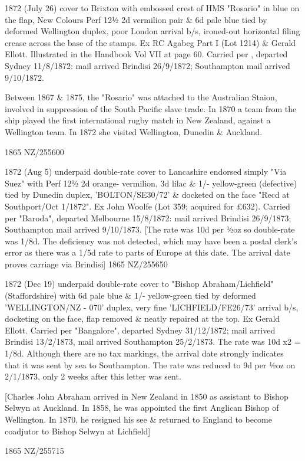 \documentclass[justified]{tufte-book}
\begin{document}
%
{1872 (July 26) cover to Brixton with embossed crest of HMS "Rosario" in blue on the flap, New Colours Perf 12½ 2d vermilion pair \& 6d pale blue tied by deformed Wellington duplex, poor London arrival b/s, ironed-out horizontal filing crease across the base of the stamps. Ex RC Agabeg Part I (Lot 1214) \& Gerald Ellott. Illustrated in the Handbook Vol VII at page 60. Carried per , departed Sydney 11/8/1872: mail arrived Brindisi 26/9/1872; Southampton mail arrived 9/10/1872.

Between 1867 \& 1875, the "Rosario" was attached to the Australian Staion, involved in suppression of the South Pacific slave trade. In 1870 a team from the ship played the first international rugby match in New Zealand, against a Wellington team. In 1872 she visited Wellington, Dunedin \& Auckland.}%
{1865}%
{NZ/255600}%
{}%
{}
{}%
{}%

%
{1872 (Aug 5) underpaid double-rate cover to Lancashire endorsed simply "Via Suez" with Perf 12½ 2d orange- vermilion, 3d lilac \& 1/- yellow-green (defective) tied by Dunedin duplex, 'BOLTON/SE30/72' \& docketed on the face "Recd at Southport/Oct 1/1872". Ex John Woolfe (Lot 359; acquired for £632). Carried per "Baroda", departed Melbourne 15/8/1872: mail arrived Brindisi 26/9/1873; Southampton mail arrived 9/10/1873. [The rate was 10d per ½oz so double-rate was 1/8d. The deficiency was not detected, which may have been a postal clerk's error as there was a 1/5d rate to parts of Europe at this date. The arrival date proves carriage via Brindisi]}%
{1865}%
{NZ/255650}%
{}%
{}
{}%
{}%

%
{1872 (Dec 19) underpaid double-rate cover to "Bishop Abraham/Lichfield" (Staffordshire) with 6d pale blue \& 1/- yellow-green tied by deformed 'WELLINGTON/NZ - 070' duplex, very fine 'LICHFIELD/FE26/73' arrival b/s, docketing on the face, flap removed \& neatly repaired at the top. Ex Gerald Ellott. Carried per "Bangalore", departed Sydney 31/12/1872; mail arrived Brindisi 13/2/1873, mail arrived Southampton 25/2/1873. The rate was 10d x2 = 1/8d. Although there are no tax markings, the arrival date strongly indicates that it was sent by sea to Southampton. The rate was reduced to 9d per ½oz on 2/1/1873, only 2 weeks after this letter was sent. 

[Charles John Abraham arrived in New Zealand in 1850 as assistant to Bishop Selwyn at Auckland. In 1858, he was appointed the first Anglican Bishop of Wellington. In 1870, he resigned his see \& returned to England to become coadjutor to Bishop Selwyn at Lichfield]}%
{1865}%
{NZ/255715}%
{}%
{}
{}%
{}%
\end{document}
